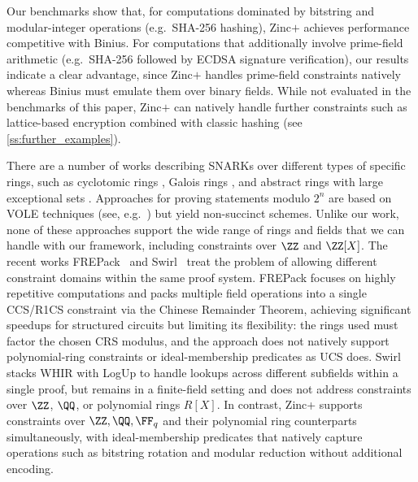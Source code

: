 Our benchmarks show that, for computations dominated by bitstring and modular-integer operations (e.g.\ SHA-256 hashing), Zinc$+$ achieves performance competitive with Binius. For computations that additionally involve prime-field arithmetic (e.g.\ SHA-256 followed by ECDSA signature verification), our results indicate a clear advantage, since Zinc$+$ handles prime-field constraints natively whereas Binius must emulate them over binary fields. While not evaluated in the benchmarks of this paper, Zinc$+$ can natively handle further constraints such as lattice-based encryption combined with classic hashing (see \cref{ss:further_examples}).  

There are a number of works describing SNARKs over different types of specific rings, such as cyclotomic rings \cite{beullens2023labrador}, Galois rings \cite{EPRINT:HuaMaoZha25,new_rings_work_two}, and  abstract rings with large exceptional sets \cite{C:BooChiSot21,attema2022vector,soria2022doubly}. Approaches for proving statements modulo $2^n$ are based on VOLE techniques (see, e.g.\ \cite{C:LinXinYao24,baum2021appenzeller,baum2022moz}) but yield non-succinct schemes.  %
%
Unlike our work, none of these approaches support the wide range of rings and fields that we can handle with our framework, including constraints over $\ZZ$ and $\ZZ[X]$. The recent works FREPack~\cite{FREPack} and Swirl~\cite{swirl} treat the problem of allowing different constraint domains within the same proof system. FREPack focuses on highly repetitive computations and packs multiple field operations into a single CCS/R1CS constraint via the Chinese Remainder Theorem, achieving significant speedups for structured circuits but limiting its flexibility: the rings used must factor the chosen CRS modulus, and the approach does not natively support polynomial-ring constraints or ideal-membership predicates as UCS does. Swirl stacks WHIR with LogUp to handle lookups across different subfields within a single proof, but remains in a finite-field setting and does not address constraints over $\ZZ$, $\QQ$, or polynomial rings $R[X]$. In contrast, Zinc+ supports constraints over $\ZZ, \QQ, \FF_q$ and their polynomial ring counterparts simultaneously, with ideal-membership predicates that natively capture operations such as bitstring rotation and modular reduction without additional encoding.

